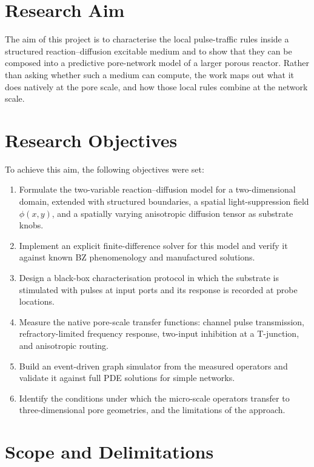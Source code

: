 \section{Research Aim}
\label{sec:aim}

The aim of this project is to characterise the local pulse-traffic rules inside a structured reaction--diffusion excitable medium and to show that they can be composed into a predictive pore-network model of a larger porous reactor.
Rather than asking whether such a medium can compute, the work maps out what it does natively at the pore scale, and how those local rules combine at the network scale.

\section{Research Objectives}
\label{sec:objectives}

To achieve this aim, the following objectives were set:

\begin{enumerate}
    \item Formulate the two-variable reaction--diffusion model for a two-dimensional domain, extended with structured boundaries, a spatial light-suppression field $\phi(x,y)$, and a spatially varying anisotropic diffusion tensor as substrate knobs.
    \item Implement an explicit finite-difference solver for this model and verify it against known BZ phenomenology and manufactured solutions.
    \item Design a black-box characterisation protocol in which the substrate is stimulated with pulses at input ports and its response is recorded at probe locations.
    \item Measure the native pore-scale transfer functions: channel pulse transmission, refractory-limited frequency response, two-input inhibition at a T-junction, and anisotropic routing.
    \item Build an event-driven graph simulator from the measured operators and validate it against full PDE solutions for simple networks.
    \item Identify the conditions under which the micro-scale operators transfer to three-dimensional pore geometries, and the limitations of the approach.
\end{enumerate}

\section{Scope and Delimitations}
\label{sec:scope}

